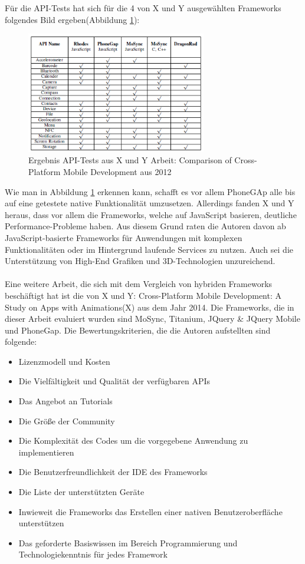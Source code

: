 Für die API-Tests hat sich für die 4 von X und Y ausgewählten Frameworks folgendes Bild ergeben(Abbildung \ref{fig:Ergebnis_API_Test_Publ}): 

\begin{figure}[h]
	\centering
	\includegraphics[width=0.7\textwidth]{Bilder/Ergebnis_Sensornutzung_Comparison_of_Cross-Platform_Mob_Dev.PNG}
	\caption{Ergebnis API-Tests aus X und Y Arbeit: Comparison of Cross-Platform Mobile Development aus 2012}
	\label{fig:Ergebnis_API_Test_Publ}
\end{figure}

Wie man in Abbildung \ref{fig:Ergebnis_API_Test_Publ} erkennen kann, schafft es vor allem PhoneGAp alle bis auf eine getestete native Funktionalität umzusetzen. Allerdings fanden X und Y heraus, dass vor allem die Frameworks, welche auf JavaScript basieren, deutliche Performance-Probleme haben. Aus diesem Grund raten die Autoren davon ab JavaScript-basierte Frameworks für Anwendungen mit komplexen Funktionalitäten oder im Hintergrund laufende Services zu nutzen. Auch sei die Unterstützung von High-End Grafiken und 3D-Technologien unzureichend. 
\\
\\
Eine weitere Arbeit, die sich mit dem Vergleich von hybriden Frameworks beschäftigt hat ist die von X und Y: Cross-Platform Mobile Development: A Study on Apps with Animations(X) aus dem Jahr 2014. Die Frameworks, die in dieser Arbeit evaluiert wurden sind MoSync, Titanium, JQuery \& JQuery Mobile und PhoneGap. Die Bewertungskriterien, die die Autoren aufstellten sind folgende:

\begin{itemize}
\item Lizenzmodell und Kosten
\item Die Vielfältigkeit und Qualität der verfügbaren APIs
\item Das Angebot an Tutorials
\item Die Größe der Community
\item Die Komplexität des Codes um die vorgegebene Anwendung zu implementieren
\item Die Benutzerfreundlichkeit der IDE des Frameworks
\item Die Liste der unterstützten Geräte
\item Inwieweit die Frameworks das Erstellen einer nativen Benutzeroberfläche unterstützen 
\item Das geforderte Basiswissen im Bereich Programmierung und Technologiekenntnis für jedes Framework
\end{itemize}

